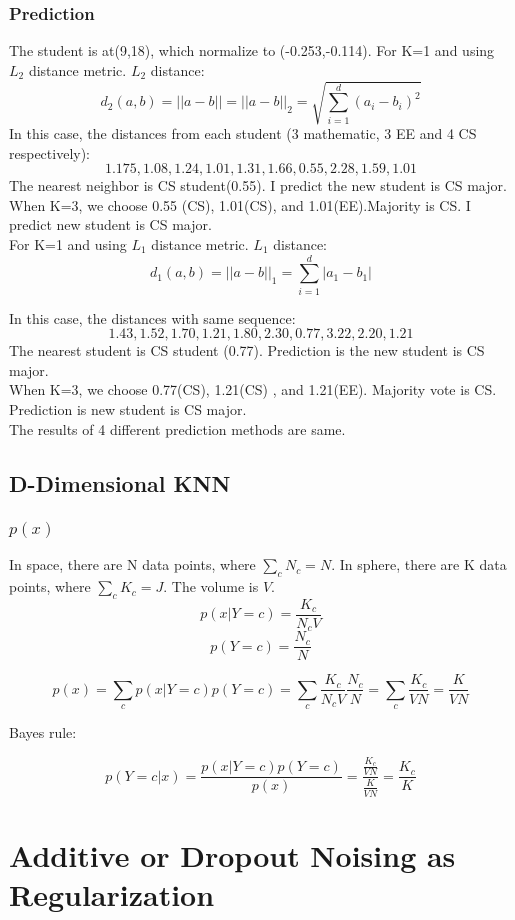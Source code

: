 \documentclass[letter,11pt]{article}
\begin{document}
	\subsubsection{Prediction}
	The student is at(9,18), which normalize to (-0.253,-0.114).
	For K=1 and using $L_2$ distance metric. $L_2$ distance:
	$$d_2(a,b) = ||a-b||=||a-b||_2=\sqrt{\sum_{i=1}^{d}(a_i-b_i)^2}$$
	In this case, the distances from each student (3 mathematic, 3 EE and 4 CS respectively):
	$$1.175,1.08,1.24,1.01,1.31,1.66,0.55,2.28,1.59,1.01$$
	The nearest neighbor is CS student(0.55). I predict the new student is CS major.
	$$  $$
	When K=3, we choose 0.55 (CS), 1.01(CS), and 1.01(EE).Majority is CS. I predict new student is CS major.\\
	
	For K=1 and using $L_1$ distance metric. $L_1$ distance:
	$$d_1(a,b) = ||a-b||_1=\sum_{i=1}^{d}|a_1-b_1|$$
	
	In this case, the distances with same sequence:
	$$1.43,1.52,1.70,1.21,1.80,2.30,0.77,3.22,2.20,1.21$$
	The nearest student is CS student (0.77). Prediction is the new student is CS major.\\
	
	When K=3, we choose 0.77(CS), 1.21(CS) , and 1.21(EE). Majority vote is CS. Prediction is new student is CS major.\\
	
	The results of 4 different prediction methods are same. 
	
	\subsection{D-Dimensional KNN}
	\subsubsection{$p(x)$}
	In space, there are N data points, where $\sum_{c}^{}N_c=N$. In sphere, there are K data points, where $\sum_{c}^{}K_c=J$. The volume is $V$.
	$$p(x|Y=c) = \frac{K_c}{N_cV}$$ $$p(Y=c)=\frac{N_c}{N}$$
	
	$$p(x)=\sum_{c}^{}p(x|Y=c)p(Y=c)=\sum_{c}^{}\frac{K_c}{N_cV}\frac{N_c}{N}=\sum_{c}^{}\frac{K_c}{VN}=\frac{K}{VN}$$
	
	Bayes rule:
	
	$$p(Y=c|x) = \frac{p(x|Y=c)p(Y=c)}{p(x)}=\frac{\frac{K_c}{VN}}{\frac{K}{VN}}=\frac{K_c}{K}$$
	
	\section{Additive or Dropout Noising as Regularization}
\end{document}
